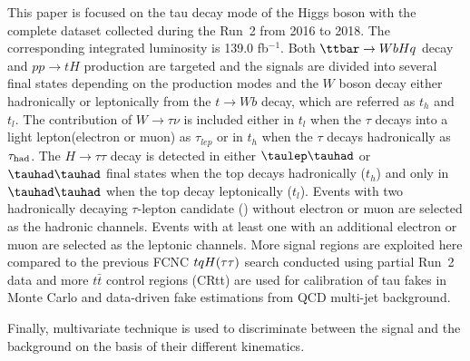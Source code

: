 
This paper is focused on the tau decay mode of the Higgs boson with the complete dataset collected during the Run~2 from 2016 to 2018. The corresponding integrated luminosity is 139.0 fb$^{-1}$. Both $\ttbar \to WbHq$ decay and $pp \to tH$ production are targeted and the signals are divided into several final states depending on the production modes and
the  $W$ boson decay either hadronically or leptonically from the $t\rightarrow Wb$ decay, which are referred as $t_h$ and $t_l$. The contribution of $W\rightarrow\tau\nu$ is included either in
$t_l$ when the $\tau$ decays into a light lepton(electron or muon) as $\tau_{lep}$ or in $t_h$ when the $\tau$ decays hadronically as $\tau_\text{had}$.
The $H\rightarrow \tau\tau$ decay is detected in
either $\tlhad$ or $\thadhad$ final states when the top decays hadronically ($t_h$) and only in $\thadhad$ when the top decay leptonically ($t_l$). 
Events with two hadronically decaying $\tau$-lepton candidate (\tauhad) without electron or muon are selected as the hadronic channels. Events with at least one \tauhad with an additional electron or muon are selected as the leptonic channels. More signal regions are exploited here compared to the previous FCNC $tqH(\tau\tau)$ search conducted using partial Run~2 data and more
$t\bar{t}$ control regions (CRtt) are used for calibration of tau fakes in Monte Carlo and data-driven fake estimations from QCD multi-jet background.

Finally, multivariate technique is used to discriminate between the signal and the background on the basis of their different kinematics. 

